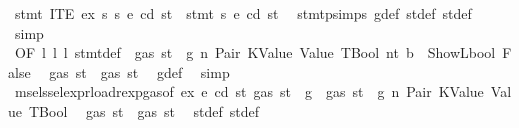 \begin{isabellebody}
\ {\isachardoublequoteopen}stmt\ {\isacharparenleft}{\kern0pt}ITE\ ex\ s{}\ s{}{\isacharparenright}{\kern0pt}\ e\ cd\ st\ {\isacharequal}{\kern0pt}\ stmt\ s{}\ e\ cd\ st{\isacharprime}{\kern0pt}{\isacharprime}{\kern0pt}{\isachardoublequoteclose}\ \isamarkupfalse%
\ stmt{\isachardot}{\kern0pt}psimps{\isacharparenleft}{\kern0pt}{}{\isacharparenright}{\kern0pt}\ g{\isacharunderscore}{\kern0pt}def\ st{\isacharprime}{\kern0pt}{\isacharunderscore}{\kern0pt}def\ st{\isacharprime}{\kern0pt}{\isacharprime}{\kern0pt}{\isacharunderscore}{\kern0pt}def\ \isamarkupfalse%
\ simp\isanewline
\ \ \ \ \ \ \ \ \ \ \ \ \ \ \ \ \ \ \ \ \isamarkupfalse%
\ {}{\isacharparenleft}{\kern0pt}{}{\isacharparenright}{\kern0pt}{\isacharbrackleft}{\kern0pt}OF\ l{}\ l{}\ l{}{\isacharbrackright}{\kern0pt}\ stmt{\isacharunderscore}{\kern0pt}def\ {\isacharbackquoteopen}{\isasymnot}\ gas\ st\ {\isasymle}\ g{\isacharbackquoteclose}\ n\ Pair\ KValue\ Value\ TBool\ nt\ {\isacharbackquoteopen}b\ {\isacharequal}{\kern0pt}\ ShowL\isactrlsub b\isactrlsub o\isactrlsub o\isactrlsub l\ False{\isacharbackquoteclose}\ \isamarkupfalse%
\ {\isachardoublequoteopen}gas\ st{}{\isacharprime}{\kern0pt}\ {\isasymle}\ gas\ st{\isacharprime}{\kern0pt}{\isacharprime}{\kern0pt}{\isachardoublequoteclose}\ \isamarkupfalse%
\ g{\isacharunderscore}{\kern0pt}def\ \isamarkupfalse%
\ simp\isanewline
\ \ \ \ \ \ \ \ \ \ \ \ \ \ \ \ \ \ \ \ \isamarkupfalse%
\ \isamarkupfalse%
\ msel{\isacharunderscore}{\kern0pt}ssel{\isacharunderscore}{\kern0pt}expr{\isacharunderscore}{\kern0pt}load{\isacharunderscore}{\kern0pt}rexp{\isacharunderscore}{\kern0pt}gas{\isacharparenleft}{\kern0pt}{}{\isacharparenright}{\kern0pt}{\isacharbrackleft}{\kern0pt}of\ ex\ e\ cd\ st{\isacharprime}{\kern0pt}\ {\isachardoublequoteopen}gas\ st\ {\isacharminus}{\kern0pt}\ g{\isachardoublequoteclose}{\isacharbrackright}{\kern0pt}\ {\isacharbackquoteopen}{\isasymnot}\ gas\ st\ {\isasymle}\ g{\isacharbackquoteclose}\ n\ Pair\ KValue\ Value\ TBool\ \isamarkupfalse%
\ {\isachardoublequoteopen}gas\ st{\isacharprime}{\kern0pt}{\isacharprime}{\kern0pt}\ {\isasymle}\ gas\ st{\isacharprime}{\kern0pt}{\isachardoublequoteclose}\ \isamarkupfalse%
\ st{\isacharprime}{\kern0pt}{\isacharunderscore}{\kern0pt}def\ st{\isacharprime}{\kern0pt}{\isacharprime}{\kern0pt}{\isacharunderscore}{\kern0pt}def\ \isamarkupfalse%

\end{isabellebody}
